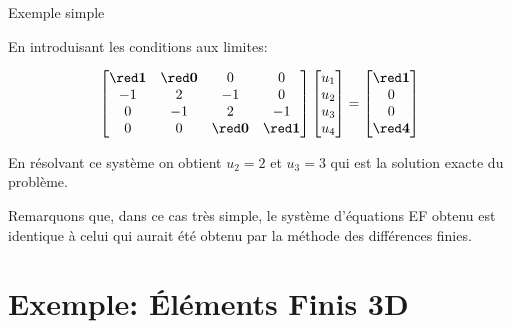 \documentclass[
mode=present,    %
paper=a4paper,   %
orient=landscape,
display=slides,   %
size=10pt,     %
style=romain   %
]{powerdot}
\begin{document}
\begin{slide}[toc=]{Exemple simple}


En introduisant les conditions aux limites:

\begin{equation*}
\begin{bmatrix}
        \red\boldsymbol{1} & \red\boldsymbol{0} &  0  & 0    \\
        -1 & 2 &  -1 & 0    \\
        0 & -1 & 2   & -1 \\
       0 & 0 &  \red\boldsymbol{0} & \red\boldsymbol{1}    \\
    \end{bmatrix}
     \begin{bmatrix}
        u_1    \\
        u_2    \\
        u_3    \\
       u_4    \\
    \end{bmatrix}
    =
     \begin{bmatrix}
        \red\boldsymbol{1}    \\
        0    \\
        0    \\
       \red\boldsymbol{4}    \\
    \end{bmatrix}
\end{equation*}

\bigskip

En résolvant ce système on obtient $u_2=2$ et $u_3=3$ qui est la solution exacte du problème.

\bigskip

Remarquons que, dans ce cas très simple, le système d'équations EF obtenu est identique à celui qui aurait été obtenu par la méthode des différences finies.



\end{slide}




\section[toc=Exemple: EF 3D]{Exemple: Éléments Finis 3D}
\end{document}
